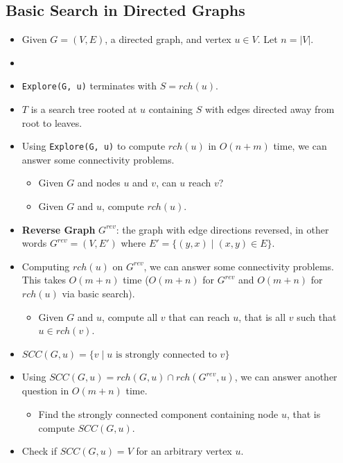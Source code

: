 \documentclass[12pt]{article}
\begin{document}
\subsection{Basic Search in Directed Graphs}
\begin{itemize}
    \item Given $G = (V, E)$, a directed graph, and vertex $u \in V$. Let $n = \left| V \right|$.
    \item[] 
    \item \texttt{Explore(G, u)} terminates with $S = rch(u)$.
    \item $T$ is a search tree rooted at $u$ containing $S$ with edges directed away from root to leaves.
    \item Using \texttt{Explore(G, u)} to compute $rch(u)$ in $O(n + m)$ time, we can answer some connectivity problems.
    \begin{itemize}
        \item Given $G$ and nodes $u$ and $v$, can $u$ reach $v$?
        \item Given $G$ and $u$, compute $rch(u)$.
    \end{itemize}
    \item \textbf{Reverse Graph} $G^{rev}$: the graph with edge directions reversed, in other words $G^{rev} = (V, E')$ where $E' = \{ (y, x) \mid (x, y) \in E \}$.
    \item Computing $rch(u)$ on $G^{rev}$, we can answer some connectivity problems. This takes $O(m + n)$ time ($O(m + n)$ for $G^{rev}$ and $O(m + n)$ for $rch(u)$ via basic search).
    \begin{itemize}
        \item Given $G$ and $u$, compute all $v$ that can reach $u$, that is all $v$ such that $u \in rch(v)$.
    \end{itemize}
    \item $SCC(G, u) = \{ v \mid u \text{ is strongly connected to } v \}$
    \item Using $SCC(G, u) = rch(G, u) \cap rch (G^{rev}, u)$, we can answer another question in $O(m + n)$ time.
    \begin{itemize}
        \item Find the strongly connected component containing node $u$, that is compute $SCC(G, u)$.
    \end{itemize}
    \item Check if $SCC(G, u) = V$ for an arbitrary vertex $u$.
    \begin{itemize}

\end{itemize}
\end{itemize}
\end{document}
